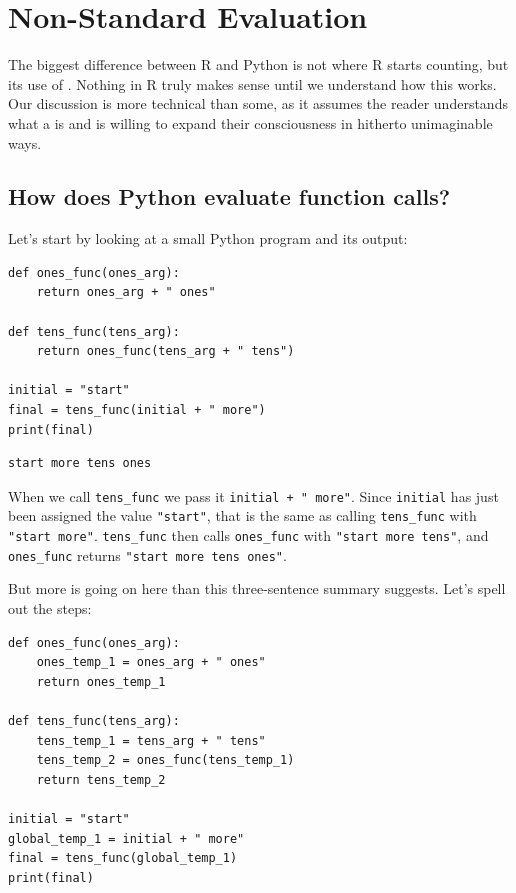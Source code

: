 \chapter{Non-Standard Evaluation}\label{nse}

The biggest difference between R and Python is not where R starts counting,
but its use of .
Nothing in R truly makes sense until we understand how this works.
Our discussion is more technical than some,
as it assumes the reader understands what a  is
and is willing to expand their consciousness in hitherto unimaginable ways.

\section{How does Python evaluate function calls?}

Let's start by looking at a small Python program and its output:

\begin{lstlisting}
def ones_func(ones_arg):
    return ones_arg + " ones"

def tens_func(tens_arg):
    return ones_func(tens_arg + " tens")

initial = "start"
final = tens_func(initial + " more")
print(final)
\end{lstlisting}

\begin{lstlisting}
start more tens ones
\end{lstlisting}

When we call \texttt{tens\_func} we pass it \texttt{initial + " more"}.
Since \texttt{initial} has just been assigned the value \texttt{"start"},
that is the same as calling \texttt{tens\_func} with \texttt{"start more"}.
\texttt{tens\_func} then calls \texttt{ones\_func} with \texttt{"start more tens"},
and \texttt{ones\_func} returns \texttt{"start more tens ones"}.

But more is going on here than this three-sentence summary suggests.
Let's spell out the steps:

\begin{lstlisting}
def ones_func(ones_arg):
    ones_temp_1 = ones_arg + " ones"
    return ones_temp_1

def tens_func(tens_arg):
    tens_temp_1 = tens_arg + " tens"
    tens_temp_2 = ones_func(tens_temp_1)
    return tens_temp_2

initial = "start"
global_temp_1 = initial + " more"
final = tens_func(global_temp_1)
print(final)
\end{lstlisting}

